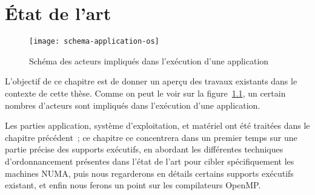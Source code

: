\chapter{État de l'art}\label{chap:rw}
\chaptertoc


\begin{figure}[ht]
  \centering
  \texttt{[image: schema-application-os]}
  \caption{Schéma des acteurs impliqués dans l'exécution d'une application}\label{fig:rw:application-os}
\end{figure}

L'objectif de ce chapitre est de donner un aperçu des travaux existants dans le contexte de cette thèse.
Comme on peut le voir sur la figure~\ref{fig:rw:application-os}, un certain nombres d'acteurs sont impliqués dans l'exécution d'une application.

Les parties application, système d'exploitation, et matériel ont été traitées dans le chapitre précédent~; ce chapitre ce concentrera dans un premier temps sur une partie précise des supports exécutifs, en abordant les différentes techniques d'ordonnancement présentes dans l'état de l'art pour cibler spécifiquement les machines NUMA, puis nous regarderons en détails certains supports exécutifs existant, et enfin nous ferons un point sur les compilateurs OpenMP.

















